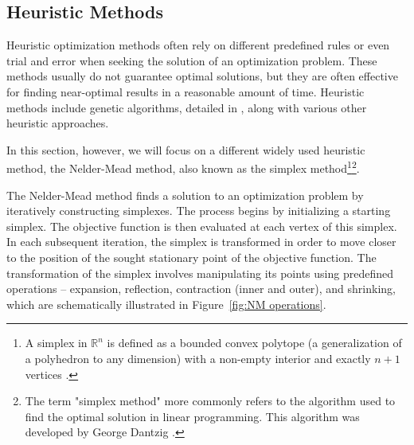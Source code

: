 \subsection{Heuristic Methods}\label{heuristic}
Heuristic optimization methods often rely on different predefined rules or even trial and error when seeking the solution of an optimization problem. These methods usually do not guarantee optimal solutions, but they are often effective for finding near-optimal results in a reasonable amount of time. Heuristic methods include genetic algorithms, detailed in \cite{BBO-textbook}, along with various other heuristic approaches.

In this section, however, we will focus on a different widely used heuristic method, the Nelder-Mead method, also known as the simplex method\footnote{A simplex in $ \mathbb{R}^n $ is defined as a bounded convex polytope (a generalization of a polyhedron to any dimension) with a non-empty interior and exactly $ n+1 $ vertices \cite{BBO-textbook}.}\footnote{The term "simplex method" more commonly refers to the algorithm used to find the optimal solution in linear programming. This algorithm was developed by George Dantzig \cite{Dantzig1990}.}\cite{Nelder1965}.

The Nelder-Mead method finds a solution to an optimization problem by iteratively constructing simplexes. The process begins by initializing a starting simplex. The objective function is then evaluated at each vertex of this simplex. In each subsequent iteration, the simplex is transformed in order to move closer to the position of the sought stationary point of the objective function. The transformation of the simplex involves manipulating its points using predefined operations -- expansion, reflection, contraction (inner and outer), and shrinking, which are schematically illustrated in Figure~\ref{fig:NM operations}. 

